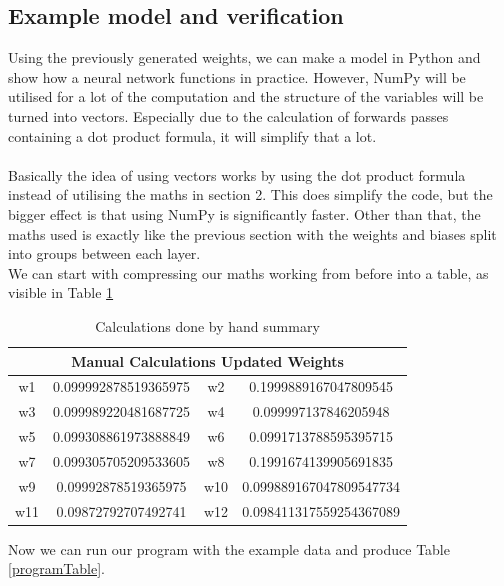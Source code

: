 \documentclass{article}
\begin{document}
\subsection{Example model and verification}
Using the previously generated weights, we can make a model in Python and show
how a neural network functions in practice. However, NumPy will be utilised for
a lot of the computation and the structure of the variables will be turned into
vectors. Especially due to the calculation of forwards passes containing a dot
product formula, it will simplify that a lot. 
\\ \\
Basically the idea of using vectors works by using the dot product formula
instead of utilising the maths in section 2. This does simplify the code, but
the bigger effect is that using NumPy is significantly faster. Other than that,
the maths used is exactly like the previous section with the weights and biases
split into groups between each layer.
\\ 
We can start with compressing our maths working from before into a table, as
visible in Table \ref{mathsTable}

\begin{table}[h]
    \centering
    \begin{tabular}{|c|c|c|c|}
        \hline
        \multicolumn{4}{|c|}{\textbf{Manual Calculations Updated Weights}} \\ \hline
        w1    & 0.099992878519365975   & w2    & 0.1999889167047809545     \\ \hline
        w3    & 0.099989220481687725   & w4    & 0.099997137846205948      \\ \hline
        w5    & 0.099308861973888849   & w6    & 0.0991713788595395715     \\ \hline
        w7    & 0.099305705209533605   & w8    & 0.1991674139905691835     \\ \hline
        w9    & 0.09992878519365975    & w10   & 0.099889167047809547734   \\ \hline
        w11   & 0.09872792707492741    & w12   & 0.098411317559254367089   \\ \hline
    \end{tabular}
    \caption{Calculations done by hand summary}
    \label{mathsTable}
\end{table}

Now we can run our program with the example data and produce Table \ref{programTable}.
\end{document}
